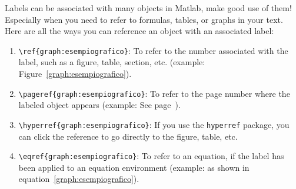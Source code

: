 Labels can be associated with many objects in Matlab, make good use of them! Especially when you need to refer to formulas, tables, or graphs in your text. Here are all the ways you can reference an object with an associated label:
\begin{enumerate}
	\item \texttt{\textbackslash ref\{graph:esempiografico\}}: To refer to the number associated with the label, such as a figure, table, section, etc. (example: Figure~\ref{graph:esempiografico}).
	\item \texttt{\textbackslash pageref\{graph:esempiografico\}}: To refer to the page number where the labeled object appears (example: See page~\pageref{graph:esempiografico}).
	\item \texttt{\textbackslash hyperref\{graph:esempiografico\}}: If you use the \texttt{hyperref} package, you can click the reference to go directly to the figure, table, etc.
	\item \texttt{\textbackslash eqref\{graph:esempiografico\}}: To refer to an equation, if the label has been applied to an equation environment (example: as shown in equation~\eqref{graph:esempiografico}).
\end{enumerate}
